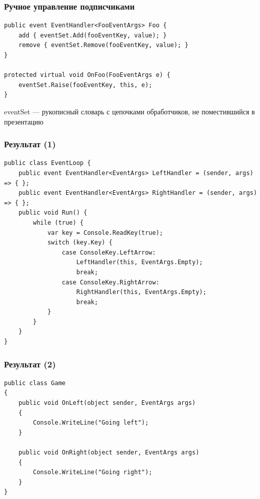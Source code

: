 \documentclass{../../slides-style}
\begin{document}
    \begin{frame}[fragile]
        \frametitle{Ручное управление подписчиками}
        \begin{verbatim}
public event EventHandler<FooEventArgs> Foo {
    add { eventSet.Add(fooEventKey, value); }
    remove { eventSet.Remove(fooEventKey, value); }
}

protected virtual void OnFoo(FooEventArgs e) {
    eventSet.Raise(fooEventKey, this, e);
}
        \end{verbatim}
        \vspace{7mm}
        eventSet --- рукописный словарь с цепочками обработчиков, не поместившийся в презентацию
    \end{frame}

    \begin{frame}[fragile]
        \frametitle{Результат (1)}
        \begin{footnotesize}
            \begin{verbatim}
public class EventLoop {
    public event EventHandler<EventArgs> LeftHandler = (sender, args) => { };
    public event EventHandler<EventArgs> RightHandler = (sender, args) => { };
    public void Run() {
        while (true) {
            var key = Console.ReadKey(true);
            switch (key.Key) {
                case ConsoleKey.LeftArrow:
                    LeftHandler(this, EventArgs.Empty);
                    break;
                case ConsoleKey.RightArrow:
                    RightHandler(this, EventArgs.Empty);
                    break;
            }
        }
    }
}
            \end{verbatim}
        \end{footnotesize}
    \end{frame}

    \begin{frame}[fragile]
        \frametitle{Результат (2)}
        \begin{footnotesize}
            \begin{verbatim}
public class Game
{
    public void OnLeft(object sender, EventArgs args)
    {
        Console.WriteLine("Going left");
    }

    public void OnRight(object sender, EventArgs args)
    {
        Console.WriteLine("Going right");
    }
}
            \end{verbatim}
        \end{footnotesize}
    \end{frame}
\end{document}
